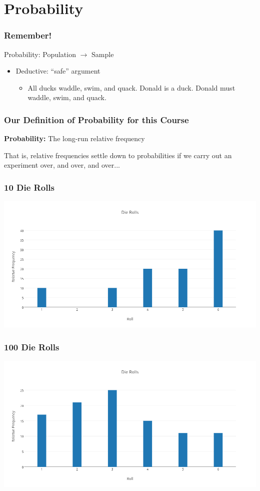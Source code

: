 \documentclass{beamer}
\begin{document}
\section{Probability}
\begin{frame}
\frametitle{Remember!}
    Probability: Population $\rightarrow$ Sample
	\begin{itemize}
		\item Deductive: ``safe'' argument
		\begin{itemize}
        		\item All ducks waddle, swim, and quack. Donald is a duck. Donald must 								
		    waddle, swim, and quack.
		\end{itemize}
	\end{itemize}
\end{frame}

\begin{frame}
\frametitle{Our Definition of Probability for this Course}
    \textbf{Probability:} The long-run relative frequency

	\vspace{3em}
	\alert{That is, relative frequencies settle down to probabilities if we carry out an experiment over, and over, and over...}
\end{frame}

\begin{frame}
\frametitle{10 Die Rolls}
    \centering
    \includegraphics[scale = 0.3]{./images/die1.png}
\end{frame}

\begin{frame}
\frametitle{100 Die Rolls}
	\centering
	\includegraphics[scale = 0.3]{./images/die2.png}
\end{frame}
\end{document}
